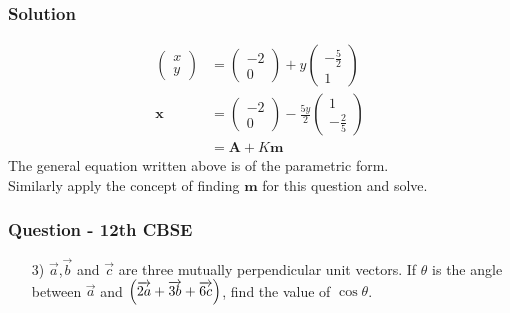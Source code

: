 \documentclass{beamer}
\begin{document}
\begin{frame}
\frametitle{Solution}
\begin{align}
    \begin{pmatrix}
        x\\
        y
    \end{pmatrix} &= \begin{pmatrix}
        -2\\
        0
    \end{pmatrix} + y\begin{pmatrix}
        -\frac{5}{2}\\
        1
    \end{pmatrix}\\
    \textbf{x} &= \begin{pmatrix}
        -2\\
        0
    \end{pmatrix} -\frac{5y}{2}\begin{pmatrix}
        1\\
        -\frac{2}{5}
    \end{pmatrix}\\
    &= \textbf{A} + K\textbf{m} \label{11}
\end{align}
The general equation written above is of the parametric form.\\
Similarly apply the concept of finding $\textbf{m}$ for this question and solve.    
\end{frame}







\begin{frame}
\frametitle{Question - 12th CBSE}
\begin{enumerate}
    \item [3)]
$\overrightarrow{a}$,$\overrightarrow{b}$ and $\overrightarrow{c}$ are three mutually perpendicular unit vectors. If $\theta$ is the angle between $\overrightarrow{a}$ and $\left(\overrightarrow{2a}+\overrightarrow{3b}+\overrightarrow{6c}\right)$, find the value of $\cos{\theta}$. 
\end{enumerate}
\end{frame}
\end{document}
